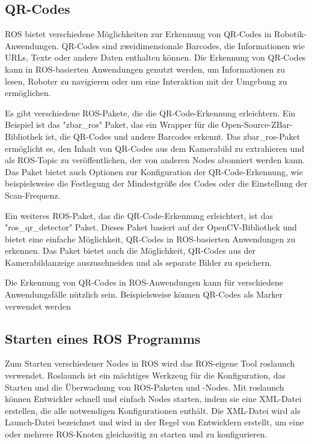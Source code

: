     \subsection{QR-Codes} \label{qr-codes:subsection}
    \ac{ROS} bietet verschiedene Möglichkeiten zur Erkennung von QR-Codes in Robotik-Anwendungen. QR-Codes sind zweidimensionale Barcodes, die Informationen wie URLs, Texte oder andere Daten enthalten können. Die Erkennung von QR-Codes kann in \ac{ROS}-basierten Anwendungen genutzt werden, um Informationen zu lesen, Roboter zu navigieren oder um eine Interaktion mit der Umgebung zu ermöglichen.

    Es gibt verschiedene \ac{ROS}-Pakete, die die QR-Code-Erkennung erleichtern. Ein Beispiel ist das "zbar\_ros" Paket, das ein Wrapper für die Open-Source-ZBar-Bibliothek ist, die QR-Codes und andere Barcodes erkennt. Das zbar\_ros-Paket ermöglicht es, den Inhalt von QR-Codes aus dem Kamerabild zu extrahieren und als \ac{ROS}-Topic zu veröffentlichen, der von anderen Nodes abonniert werden kann. Das Paket bietet auch Optionen zur Konfiguration der QR-Code-Erkennung, wie beispielsweise die Festlegung der Mindestgröße des Codes oder die Einstellung der Scan-Frequenz.

    Ein weiteres \ac{ROS}-Paket, das die QR-Code-Erkennung erleichtert, ist das "ros\_qr\_detector" Paket. Dieses Paket basiert auf der OpenCV-Bibliothek und bietet eine einfache Möglichkeit, QR-Codes in \ac{ROS}-basierten Anwendungen zu erkennen. Das Paket bietet auch die Möglichkeit, QR-Codes aus der Kamerabildanzeige auszuschneiden und als separate Bilder zu speichern.

    Die Erkennung von QR-Codes in \ac{ROS}-Anwendungen kann für verschiedene Anwendungsfälle nützlich sein. Beispielsweise können QR-Codes als Marker verwendet werden

    \subsection{Starten eines ROS Programms} \label{starten eines ROS Programms:subsection}
    Zum Starten verschiedener Nodes in \ac{ROS} wird das ROS-eigene Tool roslaunch verwendet. Roslaunch ist ein mächtiges Werkzeug für die Konfiguration, das Starten und die Überwachung von ROS-Paketen und -Nodes. Mit roslaunch können Entwickler schnell und einfach Nodes starten, indem sie eine XML-Datei erstellen, die alle notwendigen Konfigurationen enthält. Die XML-Datei wird als Launch-Datei bezeichnet und wird in der Regel von Entwicklern erstellt, um eine oder mehrere ROS-Knoten gleichzeitig zu starten und zu konfigurieren.


